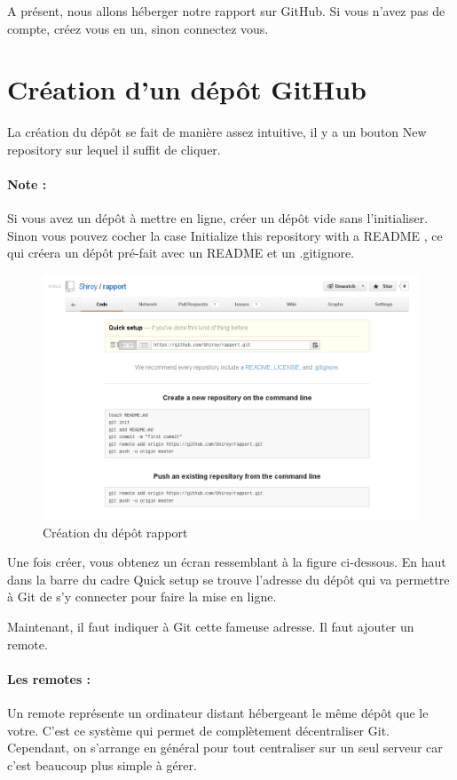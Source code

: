 \documentclass[a4paper]{article}
\begin{document}
A présent, nous allons héberger notre rapport sur GitHub. Si vous n'avez pas de compte, créez vous en un, sinon connectez vous.

\section{Création d'un dépôt GitHub}

La création du dépôt se fait de manière assez intuitive, il y a un bouton \og New repository \fg sur lequel il suffit de cliquer.

\paragraph{Note : }Si vous avez un dépôt à mettre en ligne, créer un dépôt vide sans l'initialiser. Sinon vous pouvez cocher la case \og Initialize this repository with a README  \fg, ce qui créera un dépôt pré-fait avec un README et un .gitignore.

\begin{figure}
\includegraphics[scale=0.6]{creation_depot.png}
\caption{Création du dép\^ot rapport}
\end{figure}

Une fois créer, vous obtenez un écran ressemblant à la figure ci-dessous. En haut dans la barre du cadre \og Quick setup \fg se trouve l'adresse du dépôt qui va permettre à Git de s'y connecter pour faire la mise en ligne.

Maintenant, il faut indiquer à Git cette fameuse adresse. Il faut ajouter un remote.

\paragraph{Les remotes :}Un remote représente un ordinateur distant hébergeant le même dépôt que le votre. C'est ce système qui permet de complètement décentraliser Git. Cependant, on s'arrange en général pour tout centraliser sur un seul serveur car c'est beaucoup plus simple à gérer.
\end{document}
